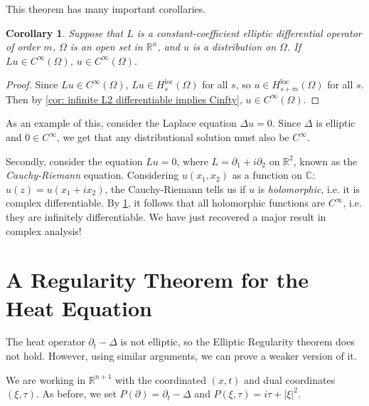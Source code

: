 \documentclass[12pt,letterpaper,reqno]{article}
\theoremstyle{plain}                              %
\newtheorem{cor}[thm]{Corollary}
\theoremstyle{definition}                         %
\theoremstyle{remark}                             %
\numberwithin{equation}{section}
\newcommand{\R}{\mathbb{R}}                     %
\newcommand{\C}{\mathbb{C}}                     %
\begin{document}
This theorem has many important corollaries.
\begin{cor}\label{cor: Lu = Cinfty implies u is Cinfty}
    Suppose that $L$ is a constant-coefficient elliptic differential operator of order $m$, $\Omega$ is an open set in $\R^n$, and $u$ is a distribution on $\Omega$. If $Lu\in C^\infty(\Omega)$, $u\in C^\infty(\Omega)$.
\end{cor}
\begin{proof}
    Since $Lu\in C^\infty(\Omega)$, $Lu\in H^{\mathrm{loc}}_{s}(\Omega)$ for all $s$, so $u\in H^{\mathrm{loc}}_{s+m}(\Omega)$ for all $s$. Then by \cref{cor: infinite L2 differentiable implies Cinfty}, $u\in C^\infty(\Omega)$.
\end{proof}
As an example of this, consider the Laplace equation $\Delta u =0$. Since $\Delta$ is elliptic and $0\in C^\infty$, we get that any distributional solution must also be $C^\infty$. 

Secondly, consider the equation $Lu = 0$, where $L = \partial_1 + i\partial_2$ on $\R^2$, known as the \textit{Cauchy-Riemann} equation. Considering $u(x_1,x_2)$ as a function on $\C$: $u(z)=u(x_1+ix_2)$, the Cauchy-Riemann tells us if $u$ is \textit{holomorphic}, i.e. it is complex differentiable. By \cref{cor: Lu = Cinfty implies u is Cinfty}, it follows that all holomorphic functions are $C^\infty$, i.e. they are infinitely differentiable. We have just recovered a major result in complex analysis!

\section{A Regularity Theorem for the Heat Equation}
The heat operator $\partial_t - \Delta$ is not elliptic, so the Elliptic Regularity theorem does not hold. However, using similar arguments, we can prove a weaker version of it.

We are working in $\R^{n+1}$ with the coordinated $(x,t)$ and dual coordinates $(\xi,\tau)$. As before, we set $P(\partial) = \partial_t - \Delta$ and $P(\xi,\tau) = i\tau + |\xi|^2$. 
\end{document}

